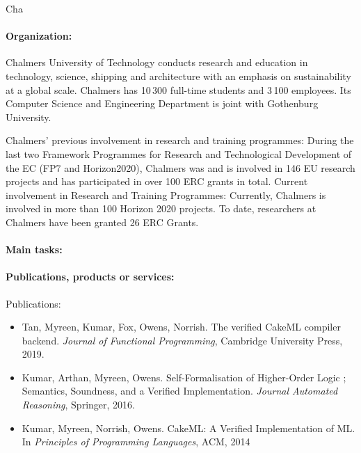 \begin{sitedescription}{Cha}

\paragraph{Organization:}

Chalmers University of Technology conducts research and education in
technology, science, shipping and architecture with an emphasis on
sustainability at a global scale. Chalmers has 10\,300 full-time
students and 3\,100 employees.  Its Computer Science and Engineering
Department is joint with Gothenburg University.

Chalmers' previous involvement in research and training programmes:
During the last two Framework Programmes for Research and
Technological Development of the EC (FP7 and Horizon2020), Chalmers
was and is involved in 146 EU research projects and has participated
in over 100 ERC grants in total.  Current involvement in Research and
Training Programmes: Currently, Chalmers is involved in more than 100
Horizon 2020 projects.  To date, researchers at Chalmers have been
granted 26 ERC Grants.


\paragraph{Main tasks:}

\begin{compactitem}
\item{}
\end{compactitem}

\paragraph{Publications, products or services:}

Publications:
\begin{itemize}
\item
  Tan, Myreen, Kumar, Fox, Owens, Norrish.
  The verified CakeML compiler backend.
  \emph{Journal of Functional Programming}, Cambridge University Press, 2019.
\item
  Kumar, Arthan, Myreen, Owens.
  Self-Formalisation of Higher-Order Logic \mdash;
  Semantics, Soundness, and a Verified Implementation.
  \emph{Journal Automated Reasoning}, Springer, 2016.
\item
  Kumar, Myreen, Norrish, Owens.
  CakeML: A Verified Implementation of ML.
  In \emph{Principles of Programming Languages}, ACM, 2014
\end{itemize}


\end{sitedescription}
